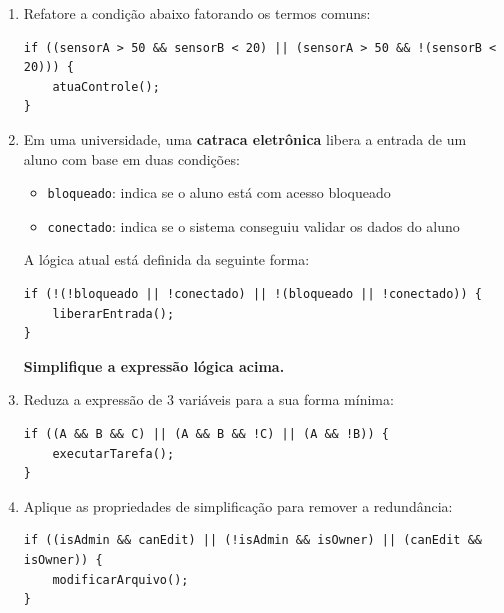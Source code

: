 \documentclass[12pt]{article}
\begin{document}
\begin{enumerate}[label=\textbf{\arabic*.}]
\vspace{0.1cm}


\item Refatore a condição abaixo fatorando os termos comuns:
\begin{codeblock}
\begin{verbatim}
if ((sensorA > 50 && sensorB < 20) || (sensorA > 50 && !(sensorB < 20))) {
    atuaControle();
}
\end{verbatim}
\end{codeblock}

\vspace{0.1cm}

\item Em uma universidade, uma \textbf{catraca eletrônica} libera a entrada de um aluno com base em duas condições:
\begin{itemize}
\item \texttt{bloqueado}: indica se o aluno está com acesso bloqueado
\item \texttt{conectado}: indica se o sistema conseguiu validar os dados do aluno
\end{itemize}

A lógica atual está definida da seguinte forma:

\begin{codeblock}
\begin{verbatim}
if (!(!bloqueado || !conectado) || !(bloqueado || !conectado)) {
    liberarEntrada();
}
\end{verbatim}
\end{codeblock}

\vspace{0.2cm}

\textbf{Simplifique a expressão lógica acima.}

\vspace{0.1cm}

\item Reduza a expressão de 3 variáveis para a sua forma mínima:
\begin{codeblock}
\begin{verbatim}
if ((A && B && C) || (A && B && !C) || (A && !B)) {
    executarTarefa();
}
\end{verbatim}
\end{codeblock}

\vspace{0.1cm}

\item Aplique as propriedades de simplificação para remover a redundância:
\begin{codeblock}
\begin{verbatim}
if ((isAdmin && canEdit) || (!isAdmin && isOwner) || (canEdit && isOwner)) {
    modificarArquivo();
}
\end{verbatim}
\end{codeblock}


\end{enumerate}
\end{document}

